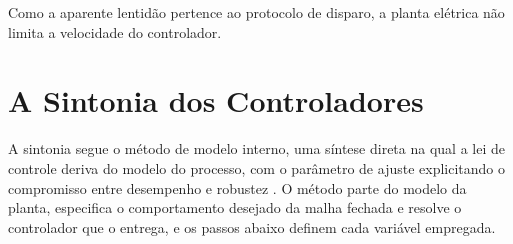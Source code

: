 Como a aparente lentidão pertence ao protocolo de disparo, a planta elétrica não limita a
velocidade do controlador.

\section{A Sintonia dos Controladores}
\label{sec:projeto_controladores}

A sintonia segue o método de modelo interno, uma síntese direta na qual a lei de controle
deriva do modelo do processo, com o parâmetro de ajuste explicitando o compromisso entre
desempenho e robustez \cite{garcia1982internal, raffo_tcpi_imc}. O método parte do modelo
da planta, especifica o comportamento desejado da malha fechada e resolve o controlador
que o entrega, e os passos abaixo definem cada variável empregada.


